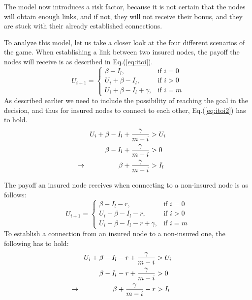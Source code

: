  The model now introduces a risk factor, because it is not certain that the nodes will obtain enough links, and if not, they will not receive their bonus, and they are stuck with their already established connections. 

To analyze this model, let us take a closer look at the four different scenarios of the game. When establishing a link between two insured nodes, the payoff the nodes will receive is as described in Eq.(\ref{eq:itoi}).
\begin{equation}
    U_{i+1}= 
\begin{cases}
    \beta - I_{l},& \text{if } i = 0\\
    U_{i}+\beta -I_{l},& \text{if }  i>0\\
    U_{i}+\beta -I_{l}+\gamma,& \text{if } i=m
    
\end{cases}
\label{eq:itoi}
\end{equation}
As described earlier we need to include the possibility of reaching the goal in the decision, and thus for insured nodes to connect to each other, Eq.(\ref{eq:itoi2}) has to hold.
\begin{eqnarray}
U_{i}+\beta-I_{l}+\frac{\gamma}{m-i}&>U_{i} \nonumber \\ 
\beta-I_{l}+\frac{\gamma}{m-i}&>0 \nonumber \\ 
\llap{$\rightarrow$\hspace{50pt}} \beta+\frac{\gamma}{m-i}&>I_{l} 
\label{eq:itoi2}
\end{eqnarray}

The payoff an insured node receives when connecting to a non-insured node is as follows:
\begin{equation}
    U_{i+1}= 
\begin{cases}
    \beta  - I_{l} -r,& \text{if } i = 0\\
    U_{i}+\beta -I_{l}-r,& \text{if }  i>0\\
    U_{i}+\beta -I_{l}-r+\gamma,& \text{if } i=m
\end{cases}
\label{eq:itonoti}
\end{equation}
To establish a connection from an insured node to a non-insured one, the following has to hold:
\begin{eqnarray}
U_{i}+\beta-I_{l}-r+\frac{\gamma}{m-i}&>U_{i} \nonumber \\ 
\beta-I_{l}-r+\frac{\gamma}{m-i}&>0 \nonumber \\ 
\llap{$\rightarrow$\hspace{50pt}} \beta+\frac{\gamma}{m-i}-r&>I_{l} 
\end{eqnarray}

